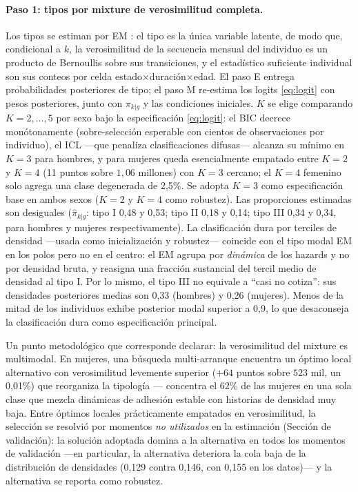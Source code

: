 \documentclass[11pt]{article}
\begin{document}
\paragraph{Paso 1: tipos por mixture de verosimilitud completa.} Los tipos
se estiman por EM \citep{heckman1984}: el tipo es la única variable latente,
de modo que, condicional a $k$, la verosimilitud de la secuencia mensual del
individuo es un producto de Bernoullis sobre sus transiciones, y el
estadístico suficiente individual son sus conteos por celda
estado$\times$duración$\times$edad. El paso E entrega probabilidades
posteriores de tipo; el paso M re-estima los logits \eqref{eq:logit} con
pesos posteriores, junto con $\pi_{k|g}$ y las condiciones iniciales. $K$ se
elige comparando $K=2,\dots,5$ por sexo bajo la especificación
\eqref{eq:logit}: el BIC decrece monótonamente (sobre-selección esperable
con cientos de observaciones por individuo), el ICL —que penaliza
clasificaciones difusas— alcanza su mínimo en $K=3$ para hombres, y para
mujeres queda esencialmente empatado entre $K=2$ y $K=4$ (11 puntos sobre
$1{,}06$ millones) con $K=3$ cercano; el $K=4$ femenino solo agrega una
clase degenerada de 2,5\%. Se adopta $K=3$ como especificación base en
ambos sexos ($K=2$ y $K=4$ como robustez). Las proporciones estimadas son
desiguales ($\hat\pi_{k|g}$: tipo I 0,48 y 0,53; tipo II 0,18 y 0,14;
tipo III 0,34 y 0,34, para hombres y mujeres respectivamente). La
clasificación dura por
terciles de densidad —usada como inicialización y robustez— coincide con
el tipo modal EM en los polos pero no en el centro: el EM agrupa por
\emph{dinámica} de los hazards y no por densidad bruta, y reasigna una
fracción sustancial del tercil medio de densidad al tipo I. Por lo
mismo, el tipo III no equivale a ``casi no cotiza'': sus densidades
posteriores medias son 0,33 (hombres) y 0,26 (mujeres). Menos de la mitad
de los individuos exhibe posterior modal superior a 0,9, lo que desaconseja
la clasificación dura como especificación principal.

Un punto metodológico que corresponde declarar: la verosimilitud del
mixture es multimodal. En mujeres, una búsqueda multi-arranque encuentra un
óptimo local alternativo con verosimilitud levemente superior
($+64$ puntos sobre $523$ mil, un 0,01\%) que reorganiza la tipología —
concentra el 62\% de las mujeres en una sola clase que mezcla dinámicas de
adhesión estable con historias de densidad muy baja. Entre óptimos locales
prácticamente empatados en verosimilitud, la selección se resolvió por
momentos \emph{no utilizados} en la estimación (Sección de validación): la
solución adoptada domina a la alternativa en todos los momentos de
validación —en particular, la alternativa deteriora la cola baja de la
distribución de densidades (0,129 contra 0,146, con 0,155 en los datos)— y
la alternativa se reporta como robustez.
\end{document}
